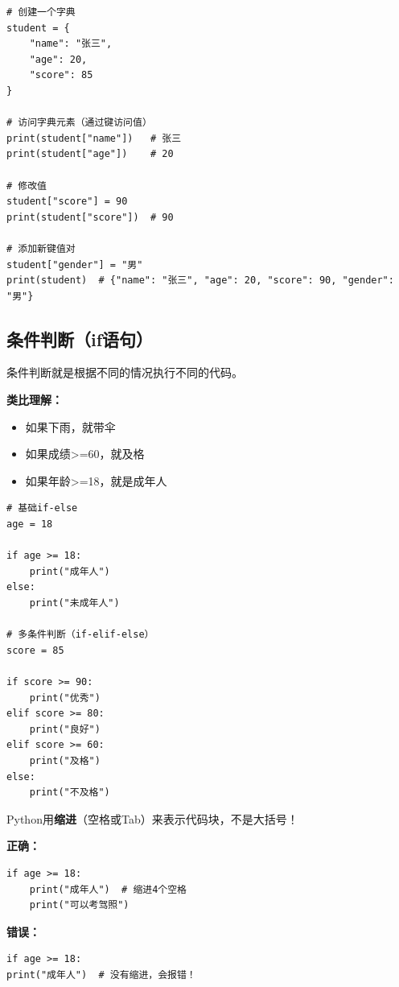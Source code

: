 \documentclass[12pt,a4paper]{article}
\begin{document}
\begin{lstlisting}[caption={字典示例}]
# 创建一个字典
student = {
    "name": "张三",
    "age": 20,
    "score": 85
}

# 访问字典元素（通过键访问值）
print(student["name"])   # 张三
print(student["age"])    # 20

# 修改值
student["score"] = 90
print(student["score"])  # 90

# 添加新键值对
student["gender"] = "男"
print(student)  # {"name": "张三", "age": 20, "score": 90, "gender": "男"}
\end{lstlisting}

\subsection{条件判断（if语句）}

\begin{knowledgebox}[什么是条件判断？]
条件判断就是根据不同的情况执行不同的代码。

\textbf{类比理解：}
\begin{itemize}
    \item 如果下雨，就带伞
    \item 如果成绩>=60，就及格
    \item 如果年龄>=18，就是成年人
\end{itemize}
\end{knowledgebox}

\begin{lstlisting}[caption={条件判断示例}]
# 基础if-else
age = 18

if age >= 18:
    print("成年人")
else:
    print("未成年人")

# 多条件判断（if-elif-else）
score = 85

if score >= 90:
    print("优秀")
elif score >= 80:
    print("良好")
elif score >= 60:
    print("及格")
else:
    print("不及格")
\end{lstlisting}

\begin{tipbox}[注意缩进]
Python用\textbf{缩进}（空格或Tab）来表示代码块，不是大括号！

\textbf{正确：}
\begin{lstlisting}
if age >= 18:
    print("成年人")  # 缩进4个空格
    print("可以考驾照")
\end{lstlisting}

\textbf{错误：}
\begin{lstlisting}
if age >= 18:
print("成年人")  # 没有缩进，会报错！
\end{lstlisting}
\end{tipbox}
\end{document}
